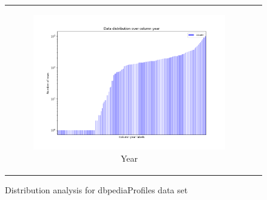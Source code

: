 \begin{figure}
{\begin{tabular}[c]{cc}
{\begin{subfigure}[c]{0.45\textwidth}
         \includegraphics[width=\textwidth]{assets/results/dbpediaProfiles/distribution/year.png}
         \caption{Year}
         \label{}
     \end{subfigure}}
     \end{tabular}
     }
    \caption{Distribution analysis for dbpediaProfiles data set}
    \label{fig:dbpediaProfiles_distribution_analysis}
\end{figure}

\clearpage

